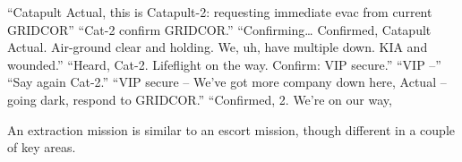                                                                      “Catapult Actual, this is Catapult-2:  
                                                                     requesting immediate evac from current  
                                                                     GRIDCOR”  
                                                                            “Cat-2 confirm GRIDCOR.”  
                                                                     “Confirming… Confirmed, Catapult Actual.  
                                                                     Air-ground clear and holding. We, uh, have  
                                                                     multiple down. KIA and wounded.”  
                                                                            “Heard, Cat-2. Lifeflight on the way.  
                                                                     Confirm: VIP secure.”  
                                                                     “VIP --”  
                                                                            “Say again Cat-2.”  
                                                                     “VIP secure -- We’ve got more company  
                                                                     down here, Actual -- going dark, respond to  
                                                                     GRIDCOR.”  
                                                                            “Confirmed, 2. We’re on our way,   

                                                                     An extraction mission is similar to an escort  
                                                                     mission, though different in a couple of key  
                                                                     areas.   

